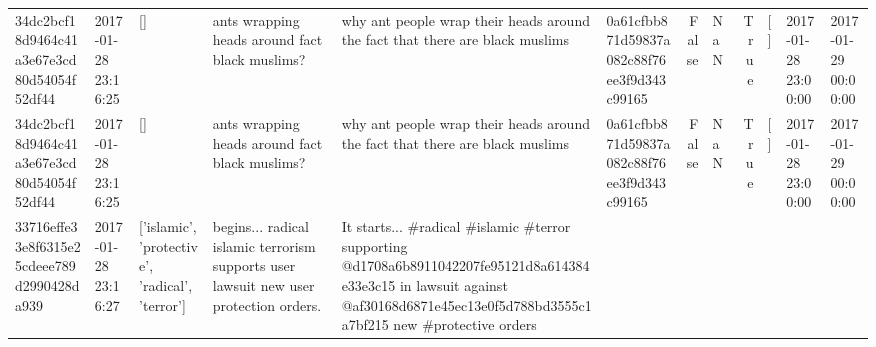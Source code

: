 \begin{tabular}{llllllrlrlll}
34dc2bcf18d9464c41a3e67e3cd80d54054f52df44 & 2017-01-28 23:16:25 & [] & ants wrapping heads around fact black muslims? & why ant people wrap their heads around the fact that there are black muslims & 0a61cfbb871d59837a082c88f76ee3f9d343c99165 & False & NaN & True & [] & 2017-01-28 23:00:00 & 2017-01-29 00:00:00 \\
34dc2bcf18d9464c41a3e67e3cd80d54054f52df44 & 2017-01-28 23:16:25 & [] & ants wrapping heads around fact black muslims? & why ant people wrap their heads around the fact that there are black muslims & 0a61cfbb871d59837a082c88f76ee3f9d343c99165 & False & NaN & True & [] & 2017-01-28 23:00:00 & 2017-01-29 00:00:00 \\
33716effe33e8f6315e25cdeee789d2990428da939 & 2017-01-28 23:16:27 & ['islamic', 'protective', 'radical', 'terror'] & begins... radical islamic terrorism supports user lawsuit new user protection orders. & It starts... \#radical \#islamic \#terror supporting @d1708a6b8911042207fe95121d8a614384e33e3c15 in lawsuit against @af30168d6871e45ec13e0f5d788bd3555c1a7bf215 new \#protective orders


\end{tabular}
